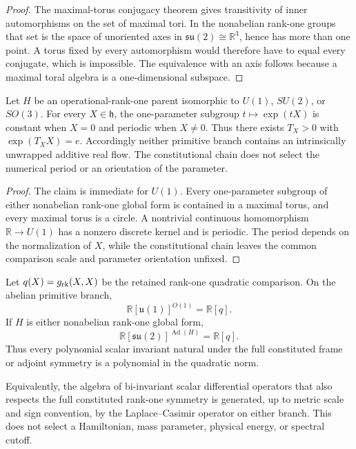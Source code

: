 \documentclass[11pt,a4paper]{article}
\begin{document}
\begin{proof}
The maximal-torus conjugacy theorem gives transitivity of inner
automorphisms on the set of maximal tori.  In the nonabelian rank-one groups
that set is the space of unoriented axes in
\(\mathfrak{su}(2)\cong\mathbb R^3\), hence has more than one point.  A torus
fixed by every automorphism would therefore have to equal every conjugate,
which is impossible.  The equivalence with an axis follows because a maximal
toral algebra is a one-dimensional subspace.
\end{proof}

\begin{theorem}
\label{p2:thm:rank-one-flow-periodicity}
Let \(H\) be an operational-rank-one parent isomorphic to \(U(1)\), \(SU(2)\),
or \(SO(3)\).  For every \(X\in\mathfrak h\), the one-parameter subgroup
\(t\mapsto\exp(tX)\) is constant when \(X=0\) and periodic when \(X\ne0\).
Thus there exists \(T_X>0\) with \(\exp(T_XX)=e\).
Accordingly neither primitive branch contains an intrinsically unwrapped
additive real flow.  The constitutional chain does not select the numerical period or an
orientation of the parameter.
\end{theorem}

\begin{proof}
The claim is immediate for \(U(1)\).  Every one-parameter subgroup of either
nonabelian rank-one global form is contained in a maximal torus, and every
maximal torus is a circle.  A nontrivial continuous homomorphism
\(\mathbb R\to U(1)\) has a nonzero discrete kernel and is periodic.  The
period depends on the normalization of \(X\), while the constitutional chain leaves the common
comparison scale and parameter orientation unfixed.
\end{proof}

\begin{theorem}
\label{p2:thm:quadratic-invariant-exhaustion}
Let \(q(X)=g_{\rm rk}(X,X)\) be the retained rank-one quadratic comparison.
On the abelian
primitive branch,
\[
 \mathbb R[\mathfrak u(1)]^{O(1)}=\mathbb R[q].
\]
If \(H\) is either nonabelian rank-one global form,
\[
 \mathbb R[\mathfrak{su}(2)]^{\operatorname{Ad}(H)}
 =\mathbb R[q].
\]
Thus every polynomial scalar invariant natural under the full constituted
frame or adjoint symmetry is a polynomial in the quadratic norm.

Equivalently, the algebra of bi-invariant scalar differential operators that
also respects the full constituted rank-one symmetry is generated, up to metric
scale and sign convention, by the Laplace--Casimir operator on either branch.
This does not select a Hamiltonian, mass parameter, physical energy, or
spectral cutoff.
\end{theorem}
\end{document}
